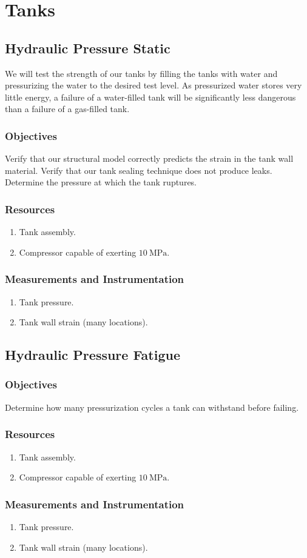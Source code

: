 \documentclass{article}
\begin{document}
\section{Tanks}
\subsection{Hydraulic Pressure Static}
We will test the strength of our tanks by filling the tanks with water and pressurizing the water to the desired test level. As pressurized water stores very little energy, a failure of a water-filled tank will be significantly less dangerous than a failure of a gas-filled tank.
\subsubsection{Objectives}
Verify that our structural model correctly predicts the strain in the tank wall material. Verify that our tank sealing technique does not produce leaks. Determine the pressure at which the tank ruptures.
\subsubsection{Resources}
\begin{enumerate}
\item Tank assembly.
\item Compressor capable of exerting $\SI{10}{\mega\pascal}$.
\end{enumerate}
\subsubsection{Measurements and Instrumentation}
\begin{enumerate}
\item Tank pressure.
\item Tank wall strain (many locations).
\end{enumerate}

\subsection{Hydraulic Pressure Fatigue}
\subsubsection{Objectives}
Determine how many pressurization cycles a tank can withstand before failing.
\subsubsection{Resources}
\begin{enumerate}
\item Tank assembly.
\item Compressor capable of exerting $\SI{10}{\mega\pascal}$.
\end{enumerate}
\subsubsection{Measurements and Instrumentation}
\begin{enumerate}
\item Tank pressure.
\item Tank wall strain (many locations).
\end{enumerate}



\begin{thebibliography}{9}

\end{thebibliography}
\end{document}
